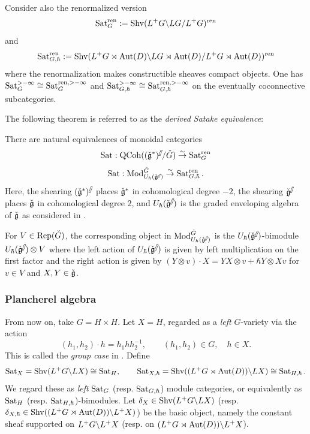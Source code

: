 \documentclass[reqno]{amsart}
\numberwithin{equation}{section}
\numberwithin{equation}{section}
\begin{document}
Consider also the renormalized version \[\operatorname{Sat}_G^{\mathrm{ren}}:=\mathrm{Shv}(L^+G\backslash LG/L^+G)^{\mathrm{ren}}\] and \[\operatorname{Sat}_{G,\hbar}^{\mathrm{ren}}:=\mathrm{Shv}(L^+G\rtimes\operatorname{Aut}(D)\backslash LG\rtimes\operatorname{Aut}(D)/L^+G\rtimes\operatorname{Aut}(D))^{\mathrm{ren}}\] where the renormalization makes constructible sheaves compact objects. One has $\operatorname{Sat}_G^{>-\infty}\cong \operatorname{Sat}_G^{\mathrm{ren},>-\infty}$ and $\operatorname{Sat}_{G,\hbar}^{>-\infty}\cong \operatorname{Sat}_{G,\hbar}^{\mathrm{ren},>-\infty}$ on the eventually coconnective subcategories.

The following theorem is referred to as the \emph{derived Satake equivalence}:
\begin{thm}[{\cite[Theorem\,5]{BF}}]\label{thm:derivedsatake}
    There are natural equivalences of monoidal categories \[\operatorname{Sat}:\mathrm{QCoh}((\check{\mathfrak{g}}^*)^{{\mathbin{\mkern-6mu\fatslash}}}/\check{G})\stackrel{\sim}{\to}\operatorname{Sat}_G^{\mathrm{ren}} \] \[ \operatorname{Sat}:\mathrm{Mod}_{U_{\hbar}(\check{\mathfrak{g}}^{{\mathbin{\mkern-6mu\fatslash}}})}^{\check{G}}\stackrel{\sim}{\to}\operatorname{Sat}_{G,\hbar}^{\mathrm{ren}}.\] Here, the shearing $(\check{\mathfrak{g}}^*)^{{\mathbin{\mkern-6mu\fatslash}}}$ places $\check{\mathfrak{g}}^*$ in cohomological degree $-2$, the shearing $\check{\mathfrak{g}}^{{\mathbin{\mkern-6mu\fatslash}}}$  places $\check{\mathfrak{g}}$ in cohomological degree $2$, and $U_{\hbar}(\check{\mathfrak{g}}^{{\mathbin{\mkern-6mu\fatslash}}})$ is the graded enveloping algebra of $\check{\mathfrak{g}}$ as considered in \cite[\S2.2]{BF}.
\end{thm}

\begin{example}\label{eg:central}
    For $V\in \operatorname{Rep}(\check{G})$, the corresponding object in $\mathrm{Mod}_{U_{\hbar}(\check{\mathfrak{g}}^{{\mathbin{\mkern-6mu\fatslash}}})}^{\check{G}}$ is the $U_{\hbar}(\check{\mathfrak{g}}^{{\mathbin{\mkern-6mu\fatslash}}})$-bimodule $U_{\hbar}(\check{\mathfrak{g}}^{{\mathbin{\mkern-6mu\fatslash}}})\otimes V$ where the left action of $U_{\hbar}(\check{\mathfrak{g}}^{{\mathbin{\mkern-6mu\fatslash}}})$ is given by left multiplication on the first factor and the right action is given by $(Y\otimes v)\cdot X = YX\otimes v + \hbar Y\otimes Xv$ for $v\in V$ and $X,Y\in \check{\mathfrak{g}}$.
\end{example}

\subsubsection{Plancherel algebra}
From now on, take $G=H\times H$. Let $X=H$, regarded as a \emph{left} $G$-variety via the action
\[
    (h_1,h_2)\cdot h=h_1hh_2^{-1},
    \qquad (h_1,h_2)\in G,
    \quad h\in X.
\] This is called the \emph{group case} in \cite{BZSV}.
Define
\[
    \operatorname{Sat}_X=\mathrm{Shv}(L^+G\backslash LX)\cong \operatorname{Sat}_H,
    \qquad
    \operatorname{Sat}_{X,\hbar}=\mathrm{Shv}((L^+G\rtimes\operatorname{Aut}(D))\backslash LX)\cong \operatorname{Sat}_{H,\hbar}.
\]
We regard these as \emph{left} $\operatorname{Sat}_G$ (resp. $\operatorname{Sat}_{G,\hbar}$) module categories, or equivalently as $\operatorname{Sat}_H$ (resp. $\operatorname{Sat}_{H,\hbar}$)-bimodules. Let $\delta_X\in \mathrm{Shv}(L^+G\backslash LX)$ (resp. $\delta_{X,\hbar}\in \mathrm{Shv}((L^+G\rtimes\operatorname{Aut}(D))\backslash L^+X)$) be the basic object, namely the constant sheaf supported on $L^+G\backslash L^+X$ (resp. on $(L^+G\rtimes\operatorname{Aut}(D))\backslash L^+X$).
\end{document}
